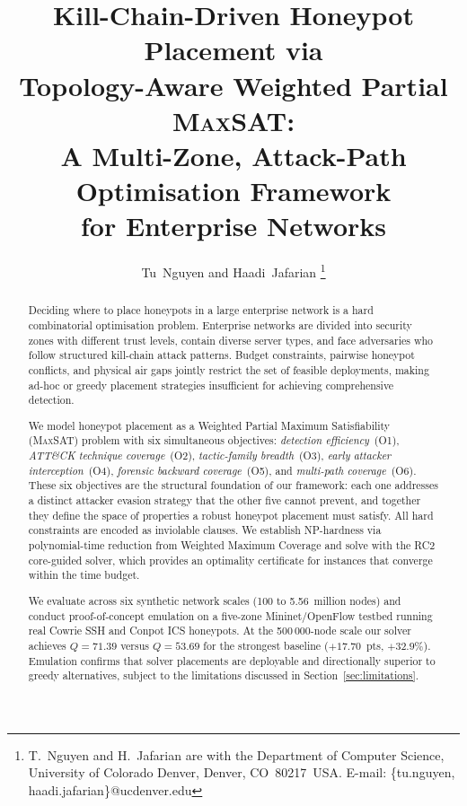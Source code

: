 \documentclass[journal]{IEEEtran}
\newcommand{\MAXSAT}{\textsc{MaxSAT}}
\begin{document}
\title{Kill-Chain-Driven Honeypot Placement via\\
Topology-Aware Weighted Partial \MAXSAT{}:\\
A Multi-Zone, Attack-Path Optimisation Framework\\
for Enterprise Networks}

\author{Tu~Nguyen and Haadi~Jafarian%
\thanks{T.~Nguyen and H.~Jafarian are with the Department of Computer
Science, University of Colorado Denver, Denver, CO~80217~USA.
E-mail: \{tu.nguyen, haadi.jafarian\}@ucdenver.edu}}

\maketitle

\begin{abstract}
Deciding where to place honeypots in a large enterprise network is a
hard combinatorial optimisation problem. Enterprise networks are
divided into security zones with different trust levels, contain
diverse server types, and face adversaries who follow structured
kill-chain attack patterns. Budget constraints, pairwise honeypot
conflicts, and physical air gaps jointly restrict the set of feasible
deployments, making ad-hoc or greedy placement strategies insufficient
for achieving comprehensive detection.

We model honeypot placement as a Weighted Partial Maximum
Satisfiability (\MAXSAT{}) problem with six simultaneous objectives:
\emph{detection efficiency}~(O1), \emph{ATT\&CK technique
coverage}~(O2), \emph{tactic-family breadth}~(O3),
\emph{early attacker interception}~(O4), \emph{forensic backward
coverage}~(O5), and \emph{multi-path coverage}~(O6). These six
objectives are the structural foundation of our framework: each
one addresses a distinct attacker evasion strategy that the other
five cannot prevent, and together they define the space of properties
a robust honeypot placement must satisfy. All hard constraints are
encoded as inviolable clauses. We establish NP-hardness via
polynomial-time reduction from Weighted Maximum Coverage and solve
with the RC2 core-guided solver, which provides an optimality
certificate for instances that converge within the time budget.

We evaluate across six synthetic network scales (100 to 5.56~million
nodes) and conduct proof-of-concept emulation on a five-zone
Mininet/OpenFlow testbed running real Cowrie SSH and Conpot ICS
honeypots. At the 500\,000-node scale our solver achieves $Q=71.39$
versus $Q=53.69$ for the strongest baseline ($+17.70$~pts,
$+32.9\%$). Emulation confirms that solver placements are deployable
and directionally superior to greedy alternatives, subject to the
limitations discussed in Section~\ref{sec:limitations}.
\end{abstract}
\end{document}
